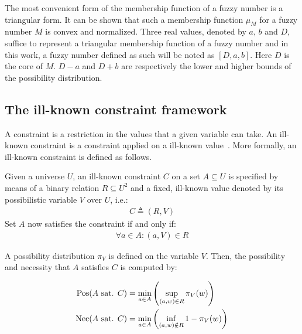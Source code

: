 The most convenient form of the membership function of a fuzzy number is a triangular form. It can be shown that such a membership function $\mu_M$ for a fuzzy number $M$ is convex and normalized. Three real values, denoted by $a$, $b$ and $D$, suffice to represent a triangular membership function of a fuzzy number and in this work, a fuzzy number defined as such will be noted as $\left[D, a, b \right]$. Here $D$ is the core of $M$. $D-a$ and $D+b$ are respectively the lower and higher bounds of the possibility distribution.



\subsection{\label{subsec:ikc-framework}The ill-known constraint framework}
A constraint is a restriction in the values that a given variable can take. An ill-known constraint is a constraint applied on a ill-known value~\cite{Pons2011}. More formally, an ill-known constraint is defined as follows.
\begin{definition}
Given a universe $U$, an ill-known constraint $C$ on a set $A \subseteq U$ is specified by means of a binary relation $R \subseteq U^{2}$ and a fixed, ill-known value denoted by its possibilistic variable $V$ over $U$, i.e.:
\begin{align}
C \triangleq (R,V)
\end{align}
Set $A$ now satisfies the constraint if and only if:
\begin{align}
\forall a \in A : (a,V) \in R
\end{align}
\end{definition}
A possibility distribution $\pi_{V}$ is defined on the variable $V$. Then, the  possibility and necessity that $A$ satisfies $C$ is computed by:

\begin{align}
\operatorname{Pos}(A\text{ sat. }C) & = \min_{a \in A}\left(\sup_{(a,w) \in R}\pi_{V}(w)\right) \label{ill-known-pos}\\
\operatorname{Nec}(A\text{ sat. }C) & = \min_{a \in A}\left(\inf_{(a,w) \notin R} 1-\pi_{V}(w)\right) \label{ill-known-nec}
\end{align}

